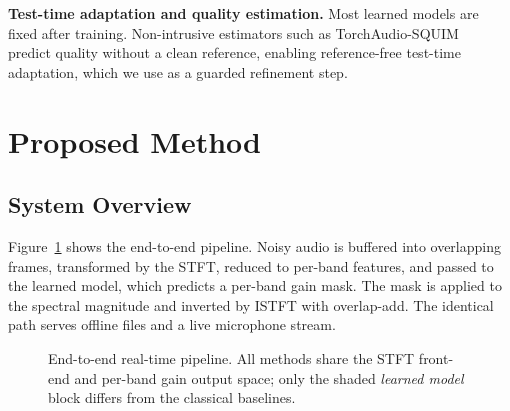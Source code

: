 \documentclass[runningheads]{llncs}
\begin{document}
\textbf{Test-time adaptation and quality estimation.} Most learned models are
fixed after training. Non-intrusive estimators such as
TorchAudio-SQUIM~\cite{squim} predict quality without a clean reference, enabling
reference-free test-time adaptation, which we use as a guarded refinement step.

\section{Proposed Method}\label{sec:method}

\subsection{System Overview}
Figure~\ref{fig:pipeline} shows the end-to-end pipeline. Noisy audio is buffered
into overlapping frames, transformed by the STFT, reduced to per-band features,
and passed to the learned model, which predicts a per-band gain mask. The mask
is applied to the spectral magnitude and inverted by ISTFT with overlap-add.
The identical path serves offline files and a live microphone stream.

\begin{figure}[t]
\centering
{}
\caption{End-to-end real-time pipeline. All methods share the STFT front-end
and per-band gain output space; only the shaded \emph{learned model} block
differs from the classical baselines.}
\label{fig:pipeline}
\end{figure}
\end{document}
